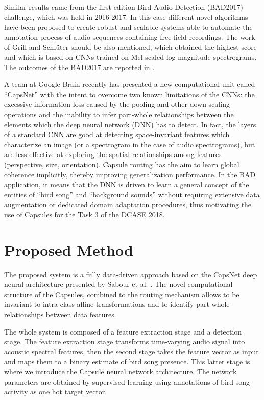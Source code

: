 Similar results came from the first edition Bird Audio Detection (BAD2017) challenge, which was held in 2016-2017. In this case different novel algorithms have been proposed to create robust and scalable systems able to automate the annotation process of audio sequences containing free-field recordings. The work of Grill and Schl\"{u}ter \cite{grill2017two} should be also mentioned, which obtained the highest score and which is based on CNNs trained on Mel-scaled log-magnitude spectrograms. The outcomes of the BAD2017 are reported in \cite{stowell2018automatic}.

A team at Google Brain recently has presented a new computational unit \cite{sabour2017dynamic} called ``CapsNet'' with the intent to overcome two known limitations of the CNNs: the excessive information loss caused by the pooling and other down-scaling operations and the inability to infer part-whole relationships between the elements which the deep neural network (DNN) has to detect. In fact, the layers of a standard CNN are good at detecting space-invariant features which characterize an image (or a spectrogram in the case of audio spectrograms), but are less effective at exploring the spatial relationships among features (perspective, size, orientation). Capsule routing has the aim to learn global coherence implicitly, thereby improving generalization performance. In the BAD application, it means that the DNN is driven to learn a general concept of the entities of ``bird song'' and ``background sounds'' without requiring extensive data augmentation or dedicated domain adaptation procedures, thus motivating the use of Capsules for the Task 3 of the DCASE 2018. %

\section{Proposed Method}
\label{sec:proposed-meth}

The proposed system is a fully data-driven approach based on the CapsNet deep neural architecture presented by Sabour et al. \cite{sabour2017dynamic}.
The novel computational structure of the Capsules, combined to the routing mechanism allows to be invariant to intra-class affine transformations and to identify part-whole relationships between data features.

The whole system is composed of a feature extraction stage and a detection stage. The feature extraction stage transforms time-varying audio signal into acoustic spectral features, then the second stage takes the feature vector as input and maps them to a binary estimate of bird song presence.
This latter stage is where we introduce the Capsule neural network architecture.
The network parameters are obtained by supervised learning using annotations of bird song activity as one hot target vector.


